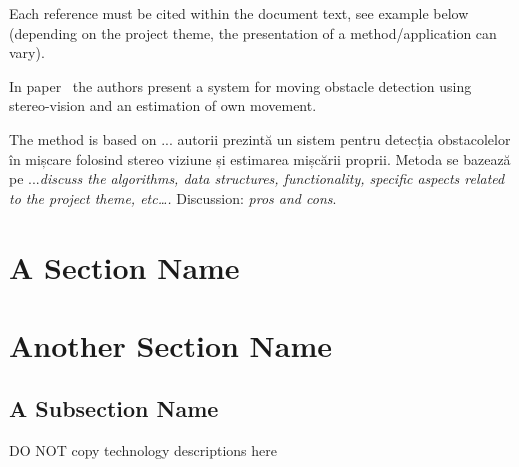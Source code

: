 Each reference must be cited within the document text, see example below (depending
on the project theme, the presentation of a method/application can vary).

In paper~\cite{AntoniouSBDB07} the authors present a system for moving obstacle detection using stereo-vision and an estimation of own movement.

The method is based on ... autorii prezintă un sistem pentru detecția obstacolelor în mișcare folosind stereo viziune și estimarea mișcării proprii.
Metoda se bazează pe ...\textit{discuss the algorithms, data structures, functionality, specific aspects related to the project theme, etc….} Discussion: \textit{pros and cons}.

\section{A Section Name}
\section{Another Section Name}
\subsection{A Subsection Name}
{\color{red}DO NOT copy technology descriptions here}

